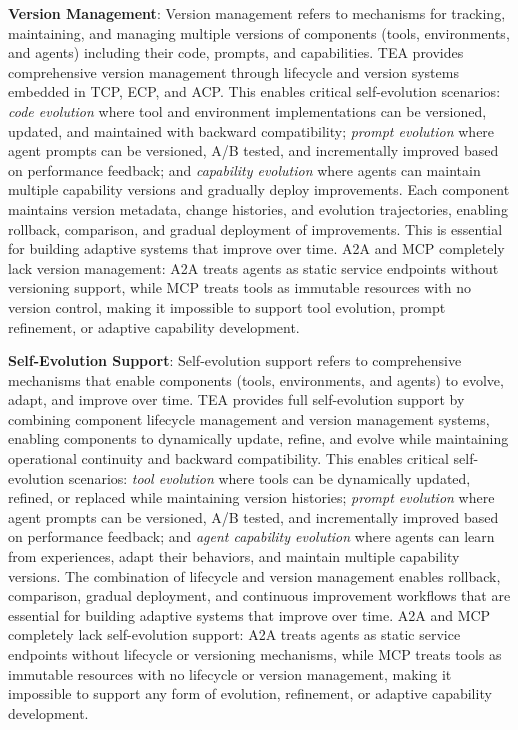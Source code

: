 \documentclass[11pt]{article}
\begin{document}
\textbf{Version Management}: Version management refers to mechanisms for tracking, maintaining, and managing multiple versions of components (tools, environments, and agents) including their code, prompts, and capabilities. TEA provides comprehensive version management through lifecycle and version systems embedded in TCP, ECP, and ACP. This enables critical self-evolution scenarios: \textit{code evolution} where tool and environment implementations can be versioned, updated, and maintained with backward compatibility; \textit{prompt evolution} where agent prompts can be versioned, A/B tested, and incrementally improved based on performance feedback; and \textit{capability evolution} where agents can maintain multiple capability versions and gradually deploy improvements. Each component maintains version metadata, change histories, and evolution trajectories, enabling rollback, comparison, and gradual deployment of improvements. This is essential for building adaptive systems that improve over time. A2A and MCP completely lack version management: A2A treats agents as static service endpoints without versioning support, while MCP treats tools as immutable resources with no version control, making it impossible to support tool evolution, prompt refinement, or adaptive capability development.

\textbf{Self-Evolution Support}: Self-evolution support refers to comprehensive mechanisms that enable components (tools, environments, and agents) to evolve, adapt, and improve over time. TEA provides full self-evolution support by combining component lifecycle management and version management systems, enabling components to dynamically update, refine, and evolve while maintaining operational continuity and backward compatibility. This enables critical self-evolution scenarios: \textit{tool evolution} where tools can be dynamically updated, refined, or replaced while maintaining version histories; \textit{prompt evolution} where agent prompts can be versioned, A/B tested, and incrementally improved based on performance feedback; and \textit{agent capability evolution} where agents can learn from experiences, adapt their behaviors, and maintain multiple capability versions. The combination of lifecycle and version management enables rollback, comparison, gradual deployment, and continuous improvement workflows that are essential for building adaptive systems that improve over time. A2A and MCP completely lack self-evolution support: A2A treats agents as static service endpoints without lifecycle or versioning mechanisms, while MCP treats tools as immutable resources with no lifecycle or version management, making it impossible to support any form of evolution, refinement, or adaptive capability development.
\end{document}
